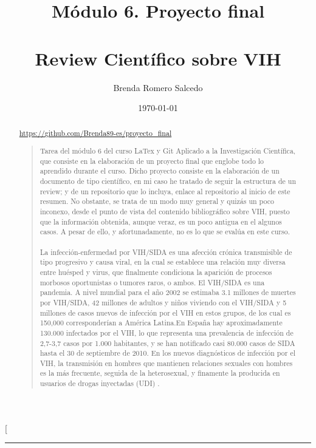 \documentclass[a4paper,twocolumn,10pt]{article}
\author{Brenda Romero Salcedo}
\title{Módulo 6. Proyecto final \\ \\Review Científico sobre VIH}
\date{\today}
\begin{document}
\twocolumn[
\begin{@twocolumnfalse}
\vspace*{-3cm}
\maketitle
\vspace*{-1cm}
\begin{center}\rule{0.9\textwidth}{0.1mm}\end{center}
\begin{abstract}
\begin{center}
\large
\url{https://github.com/Brenda89-es/proyecto_final}
\end{center}
\begin{quote}
\normalsize 
Tarea del módulo 6 del curso LaTex y Git Aplicado a la Investigación Científica, que consiste en la elaboración de un proyecto final que englobe todo lo aprendido durante el curso. Dicho proyecto consiste en la elaboración de un documento de tipo científico, en mi caso he tratado de seguir la estructura de un review; y de un repositorio que lo incluya, enlace al repositorio al inicio de este resumen. No obstante, se trata de un modo muy general y quizás un poco inconexo, desde el punto de vista del contenido bibliográfico sobre VIH, puesto que la información obtenida, aunque veraz, es un poco antigua en el algunos casos. A pesar de ello, y afortunadamente, no es lo que se evalúa en este curso. \\ \\ 
La infección-enfermedad por VIH/SIDA es una afección crónica transmisible de tipo progresivo y causa viral, en la cual se establece una relación muy diversa entre huésped y virus, que finalmente condiciona la aparición de procesos morbosos oportunistas o tumores raros, o ambos\cite{Castillo2004}.
El VIH/SIDA es una pandemia. A nivel mundial para el año 2002 se estimaba 3.1 millones de muertes por VIH/SIDA, 42 millones de adultos y niños viviendo con el VIH/SIDA y 5 millones de casos nuevos de infección por el VIH en estos grupos, de los cual es 150,000 corresponderían a América Latina\cite{LinaMariaVera2004}.En España hay aproximadamente 130.000 infectados por el VIH, lo que representa una prevalencia de infección de 2,7-3,7 casos por 1.000 habitantes, y se han notificado casi 80.000 casos de SIDA hasta el 30 de septiembre de 2010. En los nuevos diagnósticos de infección por el VIH, la transmisión en hombres que mantienen relaciones sexuales con hombres es la más frecuente, seguida de la heterosexual, y finamente la producida en usuarios de drogas inyectadas (UDI) \cite{Marco2012}.\\

\end{quote}
\end{abstract}
\end{@twocolumnfalse}
\end{document}
